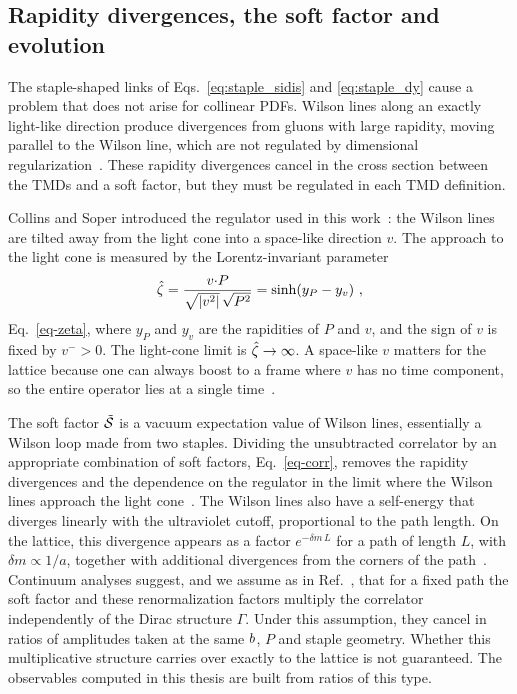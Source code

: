 \subsection{Rapidity divergences, the soft factor and evolution}
\label{sec:rapidity_soft}

The staple-shaped links of Eqs.~\eqref{eq:staple_sidis} and \eqref{eq:staple_dy} cause a problem that does not arise for collinear PDFs. Wilson lines along an exactly light-like direction produce divergences from gluons with large rapidity, moving parallel to the Wilson line, which are not regulated by dimensional regularization~\cite{Collins:2003fm,Collins:2007ph,CollinsBook2011}. These rapidity divergences cancel in the cross section between the TMDs and a soft factor, but they must be regulated in each TMD definition.

Collins and Soper introduced the regulator used in this work~\cite{Collins:1981uk,Collins:1981uw}: the Wilson lines are tilted away from the light cone into a space-like direction $v$. The approach to the light cone is measured by the Lorentz-invariant parameter
\begin{equation}
  {\hat \zeta} = \frac{v{\cdot} P}{\sqrt{|v^2|}\,\sqrt{P^2}} = \sinh(y_P - y_v) \ ,
\end{equation}
Eq.~\eqref{eq-zeta}, where $y_P$ and $y_v$ are the rapidities of $P$ and $v$, and the sign of $v$ is fixed by $v^->0$. The light-cone limit is ${\hat \zeta}\to\infty$. A space-like $v$ matters for the lattice because one can always boost to a frame where $v$ has no time component, so the entire operator lies at a single time~\cite{Musch:2011er}.

The soft factor $\tilde{\mathcal{S}}$ is a vacuum expectation value of Wilson lines, essentially a Wilson loop made from two staples. Dividing the unsubtracted correlator by an appropriate combination of soft factors, Eq.~\eqref{eq-corr}, removes the rapidity divergences and the dependence on the regulator in the limit where the Wilson lines approach the light cone~\cite{CollinsBook2011,Aybat:2011zv}. The Wilson lines also have a self-energy that diverges linearly with the ultraviolet cutoff, proportional to the path length. On the lattice, this divergence appears as a factor $e^{-\delta m\, L}$ for a path of length $L$, with $\delta m\propto 1/a$, together with additional divergences from the corners of the path~\cite{MuschThesis2,Musch:2010ka}. Continuum analyses suggest, and we assume as in Ref.~\cite{Musch:2011er}, that for a fixed path the soft factor and these renormalization factors multiply the correlator independently of the Dirac structure $\Gamma$. Under this assumption, they cancel in ratios of amplitudes taken at the same $b$, $P$ and staple geometry. Whether this multiplicative structure carries over exactly to the lattice is not guaranteed. The observables computed in this thesis are built from ratios of this type.

